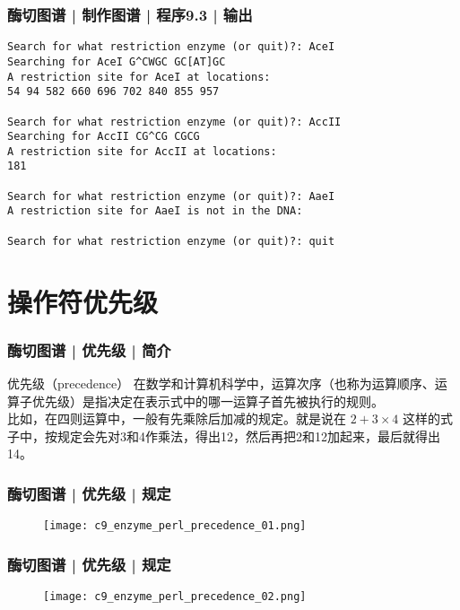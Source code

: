 \begin{frame}[fragile]
  \frametitle{酶切图谱 | 制作图谱 | 程序9.3 | 输出}
\begin{lstlisting}[basicstyle=\footnotesize\tt,numberstyle=\scriptsize]
Search for what restriction enzyme (or quit)?: AceI
Searching for AceI G^CWGC GC[AT]GC
A restriction site for AceI at locations:
54 94 582 660 696 702 840 855 957

Search for what restriction enzyme (or quit)?: AccII
Searching for AccII CG^CG CGCG
A restriction site for AccII at locations:
181

Search for what restriction enzyme (or quit)?: AaeI
A restriction site for AaeI is not in the DNA:

Search for what restriction enzyme (or quit)?: quit
\end{lstlisting}
\end{frame}

\section{操作符优先级}
\begin{frame}
  \frametitle{酶切图谱 | 优先级 | 简介}
  \begin{block}{优先级（precedence）}
    在数学和计算机科学中，运算次序（也称为运算顺序、运算子优先级）是指决定在表示式中的哪一运算子首先被执行的规则。\\
    \vspace{1em}
    比如，在四则运算中，一般有先乘除后加减的规定。就是说在 $2 + 3 \times 4 $ 这样的式子中，按规定会先对3和4作乘法，得出12，然后再把2和12加起来，最后就得出14。
  \end{block}
\end{frame}

\begin{frame}
  \frametitle{酶切图谱 | 优先级 | 规定}
  \begin{figure}
    \centering
    \texttt{[image: c9\_enzyme\_perl\_precedence\_01.png]}
  \end{figure}
\end{frame}

\begin{frame}
  \frametitle{酶切图谱 | 优先级 | 规定}
  \begin{figure}
    \centering
    \texttt{[image: c9\_enzyme\_perl\_precedence\_02.png]}
  \end{figure}
\end{frame}

